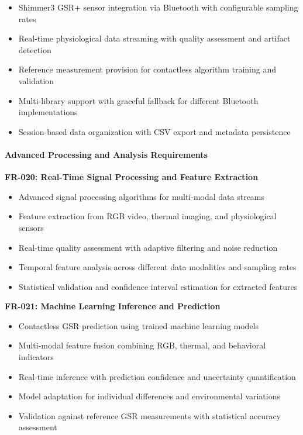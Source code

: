 \documentclass[12pt,a4paper]{report}
\begin{document}
\begin{itemize}
\item Shimmer3 GSR+ sensor integration via Bluetooth with configurable sampling rates
\item Real-time physiological data streaming with quality assessment and artifact detection
\item Reference measurement provision for contactless algorithm training and validation
\item Multi-library support with graceful fallback for different Bluetooth implementations
\item Session-based data organization with CSV export and metadata persistence

\end{itemize}
\paragraph{Advanced Processing and Analysis Requirements}

\textbf{FR-020: Real-Time Signal Processing and Feature Extraction}

\begin{itemize}
\item Advanced signal processing algorithms for multi-modal data streams
\item Feature extraction from RGB video, thermal imaging, and physiological sensors
\item Real-time quality assessment with adaptive filtering and noise reduction
\item Temporal feature analysis across different data modalities and sampling rates
\item Statistical validation and confidence interval estimation for extracted features

\end{itemize}
\textbf{FR-021: Machine Learning Inference and Prediction}

\begin{itemize}
\item Contactless GSR prediction using trained machine learning models
\item Multi-modal feature fusion combining RGB, thermal, and behavioral indicators
\item Real-time inference with prediction confidence and uncertainty quantification
\item Model adaptation for individual differences and environmental variations
\item Validation against reference GSR measurements with statistical accuracy assessment

\end{itemize}
\end{document}
